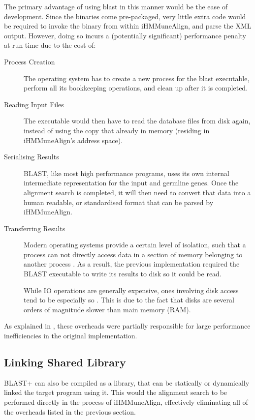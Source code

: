 The primary advantage of using blast in this manner would be the ease of development. Since the binaries come pre-packaged, very little extra code would be required to invoke the binary from within iHMMuneAlign, and parse the XML output. However, doing so incurs a (potentially significant) performance penalty at run time due to the cost of:

\begin{description}
	\item[Process Creation]
	The operating system has to create a new process for the blast executable, perform all its bookkeeping operations, and clean up after it is completed.
	\item[Reading Input Files]
	The executable would then have to read the database files from disk again, instead of using the copy that already in memory (residing in iHMMuneAlign's address space).
	\item[Serialising Results]
	BLAST, like most high performance programs, uses its own internal intermediate representation for the input and germline genes\autocite{blast}. Once the alignment search is completed, it will then need to convert that data into a human readable, or standardised format that can be parsed by iHMMuneAlign.
	\item[Transferring Results]
    Modern operating systems provide a certain level of isolation, such that a process can not directly access data in a section of memory belonging to another process \autocite{address-spaces}. As a result, the previous implementation required the BLAST executable to write its results to disk so it could be read.
    
    While IO operations are generally expensive, ones involving disk access tend to be especially so \autocite{os-io}. This is due to the fact that disks are several orders of magnitude slower than main memory (RAM).
\end{description}

As explained in , these overheads were partially responsible for large performance inefficiencies in the original implementation. 

\subsection{Linking Shared Library}
\label{sec:blast-lib}
BLAST+ can also be compiled as a library, that can be statically or dynamically linked the target program using it. This would the alignment search to be performed directly in the process of iHMMuneAlign, effectively eliminating all of the overheads listed in the previous section.

